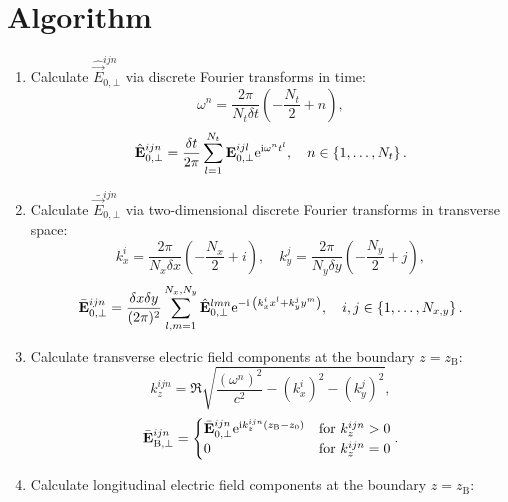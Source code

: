 \section{Algorithm}

\begin{enumerate}
	\item Calculate $ \hat{\vec{E}}_{0, \bot}^{ijn} $ via discrete Fourier transforms in time:
	\begin{equation}
	\omega^n = \frac{2 \pi}{N_t \delta t} \left( -\frac{N_t}{2} + n \right),
	\end{equation}
	\begin{equation}
	\hat{\mathbf{E}}_{0, \bot}^{ijn} = \frac{\delta t}{2 \pi} \sum_{l=1}^{N_t} \mathbf{E}_{0, \bot}^{ijl} \mathrm{e}^{\mathrm{i} \omega^n t^l}, \quad n \in \left\lbrace 1, \dots, N_t \right\rbrace.
	\end{equation}
	\item Calculate $ \bar{\vec{E}}_{0, \bot}^{ijn} $ via two-dimensional discrete Fourier transforms in transverse space:
	\begin{equation}
	k_x^i = \frac{2 \pi}{N_x \delta x} \left( - \frac{N_x}{2} + i\right), \quad k_y^j = \frac{2 \pi}{N_y \delta y} \left( - \frac{N_y}{2} + j\right),
	\end{equation}
	\begin{equation}
	\bar{\mathbf{E}}_{0, \bot}^{ijn} = \frac{\delta x \delta y}{(2 \pi)^2} \sum_{l, m = 1}^{N_x, N_y} \hat{\mathbf{E}}_{0, \bot}^{lmn} \mathrm{e}^{- \mathrm{i} \: \left(k_x^i x^l + k_y^j y^m \right)}, \quad i, j \in \left\lbrace 1, \dots, N_{x, y} \right\rbrace.
	\end{equation}
	\item Calculate transverse electric field components at the boundary $ z = z_\mathrm{B} $:
	\begin{equation}
	k_z^{ijn} = \Re \sqrt{\frac{(\omega^n)^2}{c^2} - (k_x^i)^2 - (k_y^j)^2},
	\end{equation}
	\begin{equation}
	\bar{\mathbf{E}}_{\mathrm{B}, \bot}^{ijn} =
	\begin{cases} \bar{\mathbf{E}}_{0, \bot}^{ijn} \mathrm{e}^{\mathrm{i} k_z^{ijn}(z_\mathrm{B} - z_0)} & \text{for} \ k_z^{ijn} > 0 \\ 0 & \text{for} \ k_z^{ijn} = 0 \end{cases}.
	\end{equation}
	\item Calculate longitudinal electric field components at the boundary $ z = z_\mathrm{B} $:
	\begin{equation}

\end{equation}
\end{enumerate}
